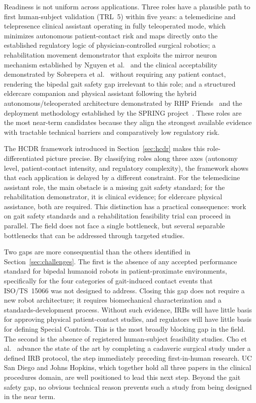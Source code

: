 Readiness is not uniform across applications. Three roles have a plausible path to
first human-subject validation (TRL~5) within five years: a telemedicine and
telepresence clinical assistant operating in fully teleoperated mode, which
minimizes autonomous patient-contact risk and maps directly onto the established
regulatory logic of physician-controlled surgical robotics; a rehabilitation
movement demonstrator that exploits the mirror neuron mechanism established by
Nguyen et al.~\cite{nguyen2024eeg} and the clinical acceptability demonstrated by
Sobrepera et al.~\cite{sobrepera2022feasibility} without requiring any patient
contact, rendering the bipedal gait safety gap irrelevant to this role; and a
structured eldercare companion and physical assistant following the hybrid
autonomous/teleoperated architecture demonstrated by RHP
Friends~\cite{benallegue2025rhp} and the deployment methodology established by
the SPRING project~\cite{alamedapineda2024spring}. These roles are the most
near-term candidates because they align the strongest available evidence with
tractable technical barriers and comparatively low regulatory risk.

The HCDR framework introduced in Section~\ref{sec:hcdr} makes this
role-differentiated picture precise. By classifying roles along three axes (autonomy
level, patient-contact intensity, and regulatory complexity), the framework
shows that each application is delayed by a different constraint. For the
telemedicine assistant role, the main obstacle is a missing gait safety standard;
for the rehabilitation demonstrator, it is clinical evidence; for eldercare
physical assistance, both are required. This distinction has a practical
consequence: work on gait safety standards and a rehabilitation feasibility trial
can proceed in parallel. The field does not face a single bottleneck, but several
separable bottlenecks that can be addressed through targeted studies.

Two gaps are more consequential than the others identified in
Section~\ref{sec:challenges}. The first is the absence of any accepted performance
standard for bipedal humanoid robots in patient-proximate environments, specifically
for the four categories of gait-induced contact events that ISO/TS~15066 was not
designed to address. Closing this gap does not require a new robot architecture;
it requires biomechanical characterization and a standards-development process.
Without such evidence, IRBs will have little basis for approving physical
patient-contact studies, and regulators will have little basis for defining
Special Controls. This is the most broadly blocking gap in the field. The second
is the absence of registered
human-subject feasibility studies. Cho et al.~\cite{cho2026humanoid} advance the
state of the art by completing a cadaveric surgical study under a defined IRB
protocol, the step immediately preceding first-in-human research. UC San Diego
and Johns Hopkins, which together hold all three papers in the clinical procedures
domain, are well positioned to lead this next step. Beyond the gait safety gap,
no obvious technical reason prevents such a study from being designed in the near
term.

